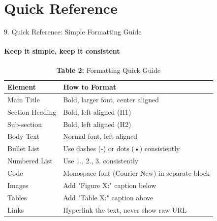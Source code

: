\documentclass[10pt, aspectratio=169]{beamer}
\begin{document}
	\section{Quick Reference}
	\begin{frame}{9. Quick Reference: Simple Formatting Guide}
		\framesubtitle{Keep it simple, keep it consistent}
		
		\begin{table}[]
			\centering
			\caption{\textbf{Table 2:} Formatting Quick Guide}
			\begin{tabular}{|p{3cm}|p{8cm}|}
				\hline
				\textbf{Element} & \textbf{How to Format} \\
				\hline
				Main Title & Bold, larger font, center aligned \\
				\hline
				Section Heading & Bold, left aligned (H1) \\
				\hline
				Sub-section & Bold, left aligned (H2) \\
				\hline
				Body Text & Normal font, left aligned \\
				\hline
				Bullet List & Use dashes (-) or dots (•) consistently \\
				\hline
				Numbered List & Use 1., 2., 3. consistently \\
				\hline
				Code & Monospace font (Courier New) in separate block \\
				\hline
				Images & Add "Figure X:" caption below \\
				\hline
				Tables & Add "Table X:" caption above \\
				\hline
				Links & Hyperlink the text, never show raw URL \\
				\hline
			\end{tabular}
		\end{table}
	\end{frame}
	
\end{document}
